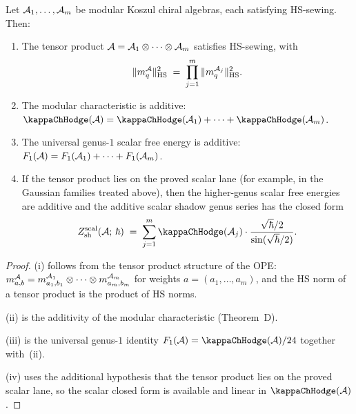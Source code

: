 \begin{proposition}
Let $\mathcal{A}_1, \ldots, \mathcal{A}_m$ be modular Koszul chiral algebras, each satisfying HS-sewing. Then:
\begin{enumerate}[label=\textup{(\roman*)}]
\item The tensor product $\mathcal{A} = \mathcal{A}_1 \otimes \cdots \otimes \mathcal{A}_m$ satisfies HS-sewing, with
 \begin{equation}%
 \|m_q^{\cA}\|_{\HS}^2 \;=\; \prod_{j=1}^m \|m_q^{\cA_j}\|_{\HS}^2.
 \end{equation}
\item The modular characteristic is additive: $\kappaChHodge(\cA) = \kappaChHodge(\cA_1) + \cdots + \kappaChHodge(\cA_m)$.
\item The universal genus-$1$ scalar free energy is additive:
 $F_1(\mathcal{A}) = F_1(\mathcal{A}_1) + \cdots + F_1(\mathcal{A}_m)$.
\item If the tensor product lies on the proved scalar lane
 \textup{(}for example, in the Gaussian families treated above\textup{)},
 then the higher-genus scalar free energies are additive and the
 additive scalar shadow genus series has the closed form
 \begin{equation}%
 Z_{\mathrm{sh}}^{\mathrm{scal}}(\cA;\,\hbar) \;=\; \sum_{j=1}^m \kappaChHodge(\cA_j) \cdot \frac{\sqrt{\hbar}/2}{\sin(\sqrt{\hbar}/2)}.
 \end{equation}
\end{enumerate}
\end{proposition}

\begin{proof}
(i) follows from the tensor product structure of the OPE: $m^{\mathcal{A}}_{a,b} = m^{\mathcal{A}_1}_{a_1,b_1} \otimes \cdots \otimes m^{\mathcal{A}_m}_{a_m,b_m}$ for weights $a = (a_1,\ldots,a_m)$, and the HS norm of a tensor product is the product of HS norms.

(ii) is the additivity of the modular characteristic (Theorem~D).

(iii) is the universal genus-$1$ identity
$F_1(\cA)=\kappaChHodge(\cA)/24$ together with~(ii).

(iv) uses the additional hypothesis that the tensor product lies on the
proved scalar lane, so the scalar closed form is available and linear in
$\kappaChHodge(\cA)$.
\end{proof}

